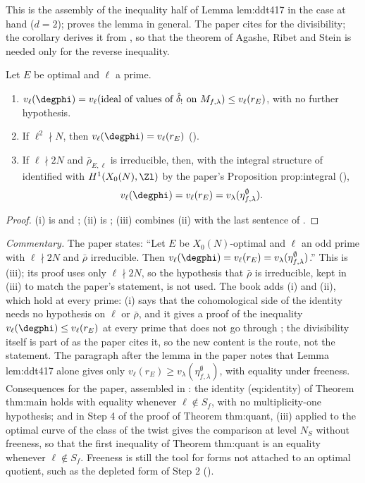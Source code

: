 This is the assembly of the inequality half of Lemma lem:ddt417 in the case at hand ($d=2$);  proves the lemma in general. The paper cites \cite{ARS12} for the
divisibility; the corollary derives it from , so that the theorem of Agashe, Ribet and Stein is needed only for the reverse inequality.

\begin{theorem}\label{thm:moddeg:lem-hecke}
Let $E$ be optimal and $\ell$ a prime.
\begin{enumerate}[label=(\roman*)]
\item $v_\ell(\degphi)=v_\ell(\text{ideal of values of }\hat\delta_!\text{ on }M_{f,\lambda})\le v_\ell(r_E)$, with no further hypothesis.
\item If $\ell^2\nmid N$, then $v_\ell(\degphi)=v_\ell(r_E)$ ().
\item If $\ell\nmid2N$ and $\bar\rho_{E,\ell}$ is irreducible, then, with the integral structure of \cite{DFG04} identified with $H^1(X_0(N),\Zl)$ by the paper's Proposition prop:integral
(),
\[
v_\ell(\degphi)=v_\ell(r_E)=v_\lambda(\eta^\emptyset_{f,\lambda}).
\]
\end{enumerate}
\end{theorem}

\begin{proof}
(i) is  and ; (ii) is ; (iii) combines (ii) with the last sentence of .
\end{proof}

\noindent\emph{Commentary.} The paper states: ``Let $E$ be $X_0(N)$-optimal and $\ell$ an odd prime with $\ell\nmid 2N$ and $\bar\rho$ irreducible. Then $v_\ell(\degphi)=v_\ell(r_E)=v_\lambda(\eta^\emptyset_{f,\lambda})$.'' This is (iii); its proof uses only $\ell\nmid2N$, so the hypothesis that $\bar\rho$ is irreducible, kept in (iii) to match the paper's statement, is not used. The book adds (i) and (ii), which hold at every prime: (i) says that the
cohomological side of the identity needs no hypothesis on $\ell$ or $\bar\rho$, and it gives a proof of the inequality $v_\ell(\degphi)\le v_\ell(r_E)$ at every prime that does not go
through \cite{ARS12}; the divisibility itself is part of \cite[Theorem 2.2]{ARS12} as the paper cites it, so the new content is the route, not the statement. The paragraph after the lemma in the paper notes that Lemma lem:ddt417 alone gives only $v_\ell(r_E)\ge v_\lambda(\eta^\emptyset_{f,\lambda})$, with
equality under freeness. Consequences for the paper, assembled in : the identity (eq:identity) of
Theorem thm:main holds with equality whenever $\ell\notin S_f$, with no multiplicity-one hypothesis; and in Step 4 of the proof of Theorem thm:quant, (iii) applied to the optimal curve
of the class of the twist gives the comparison at level $N_S$ without freeness, so that the first inequality of Theorem thm:quant is an equality whenever $\ell\notin S_f$. Freeness is still
the tool for forms not attached to an optimal quotient, such as the depleted form of Step 2 ().

